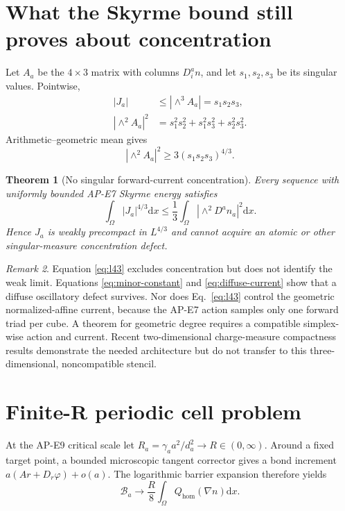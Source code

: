 \documentclass[11pt]{article}
\numberwithin{equation}{section}
\newtheorem{theorem}{Theorem}[section]
\theoremstyle{definition}
\theoremstyle{remark}
\newtheorem{remark}[theorem]{Remark}
\newcommand{\cB}{\mathcal B}
\newcommand{\dd}{\mathrm d}
\begin{document}
\section{What the Skyrme bound still proves about concentration}

Let $A_a$ be the $4\times3$ matrix with columns $D_i^an$, and let
$s_1,s_2,s_3$ be its singular values.  Pointwise,
\begin{align}
 |J_a|&\le |\wedge^3A_a|=s_1s_2s_3,\\
 |\wedge^2A_a|^2
 &=s_1^2s_2^2+s_1^2s_3^2+s_2^2s_3^2.
\end{align}
Arithmetic--geometric mean gives
\begin{equation}
 |\wedge^2A_a|^2\ge
 3(s_1s_2s_3)^{4/3}.
 \label{eq:amgm}
\end{equation}

\begin{theorem}[No singular forward-current concentration]
Every sequence with uniformly bounded AP-E7 Skyrme energy satisfies
\begin{equation}
 \boxed{\int_\Omega |J_a|^{4/3}\dd x
 \le\frac13\int_\Omega|\wedge^2D^an_a|^2\dd x.}
 \label{eq:l43}
\end{equation}
Hence $J_a$ is weakly precompact in $L^{4/3}$ and cannot acquire an atomic or
other singular-measure concentration defect.
\end{theorem}

\begin{remark}
Equation \eqref{eq:l43} excludes concentration but does not identify the weak
limit.  Equations \eqref{eq:minor-constant} and \eqref{eq:diffuse-current}
show that a diffuse oscillatory defect survives.  Nor does
Eq.~\eqref{eq:l43} control the geometric normalized-affine current, because
the AP-E7 action samples only one forward triad per cube.  A theorem for
geometric degree requires a compatible simplex-wise action and current.
Recent two-dimensional charge-measure compactness results
\cite{BrianiCicaleseKreutz2026} demonstrate the needed architecture but do
not transfer to this three-dimensional, noncompatible stencil.
\end{remark}

\section{Finite-R periodic cell problem}

At the AP-E9 critical scale let $R_a=\gamma_a a^2/d_a^2\to R\in(0,\infty)$.
Around a fixed target point, a bounded microscopic tangent corrector gives a
bond increment $a(Ar+D_r\varphi)+o(a)$.  The logarithmic barrier expansion
therefore yields
\begin{equation}
 \cB_a\longrightarrow \frac{R}{8}\int_\Omega
 Q_{\mathrm{hom}}(\nabla n)\dd x.
 \label{eq:barrier-limit}
\end{equation}
\end{document}
